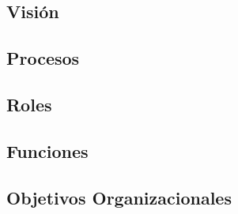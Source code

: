 \subsection{Visión}

\subsection{Procesos}

\subsection{Roles}

\subsection{Funciones}

\subsection{Objetivos Organizacionales}

\newpage